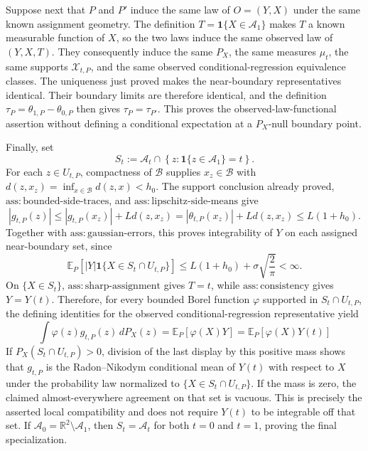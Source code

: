 Suppose next that \(P\) and \(P'\) induce the same law of \(O=(Y,X)\) under the same known assignment geometry. The definition \(T=\mathbf 1\{X\in\mathcal A_1\}\) makes \(T\) a known measurable function of \(X\), so the two laws induce the same observed law of \((Y,X,T)\). They consequently induce the same \(P_X\), the same measures \(\mu_t\), the same supports \(\mathcal X_{t,P}\), and the same observed conditional-regression equivalence classes. The uniqueness just proved makes the near-boundary representatives identical. Their boundary limits are therefore identical, and the definition \(\tau_P=\theta_{1,P}-\theta_{0,P}\) then gives \(\tau_P=\tau_{P'}\). This proves the observed-law-functional assertion without defining a conditional expectation at a \(P_X\)-null boundary point.

Finally, set
\[
S_t:=\mathcal A_t\cap\left\{z:\mathbf 1\{z\in\mathcal A_1\}=t\right\}.
\]
For each \(z\in U_{t,P}\), compactness of \(\mathcal B\) supplies \(x_z\in\mathcal B\) with \(d(z,x_z)=\inf_{x\in\mathcal B}d(z,x)<h_0\). The support conclusion already proved, \(\mathrm{ass:bounded\text{-}side\text{-}traces}\), and \(\mathrm{ass:lipschitz\text{-}side\text{-}means}\) give
\[
|g_{t,P}(z)|\le |g_{t,P}(x_z)|+Ld(z,x_z)
=|\theta_{t,P}(x_z)|+Ld(z,x_z)
\le L(1+h_0).
\]
Together with \(\mathrm{ass:gaussian\text{-}errors}\), this proves integrability of \(Y\) on each assigned near-boundary set, since
\[
\mathbb E_P\!\left[|Y|\mathbf 1\{X\in S_t\cap U_{t,P}\}\right]
\le L(1+h_0)+\sigma\sqrt{\frac{2}{\pi}}<\infty.
\]
On \(\{X\in S_t\}\), \(\mathrm{ass:sharp\text{-}assignment}\) gives \(T=t\), while \(\mathrm{ass:consistency}\) gives \(Y=Y(t)\). Therefore, for every bounded Borel function \(\varphi\) supported in \(S_t\cap U_{t,P}\), the defining identities for the observed conditional-regression representative yield
\[
\int \varphi(z)g_{t,P}(z)\,dP_X(z)
=\mathbb E_P\!\left[\varphi(X)Y\right]
=\mathbb E_P\!\left[\varphi(X)Y(t)\right]
\]
If \(P_X(S_t\cap U_{t,P})>0\), division of the last display by this positive mass shows that \(g_{t,P}\) is the Radon--Nikodym conditional mean of \(Y(t)\) with respect to \(X\) under the probability law normalized to \(\{X\in S_t\cap U_{t,P}\}\). If the mass is zero, the claimed almost-everywhere agreement on that set is vacuous. This is precisely the asserted local compatibility and does not require \(Y(t)\) to be integrable off that set. If \(\mathcal A_0=\mathbb R^2\setminus\mathcal A_1\), then \(S_t=\mathcal A_t\) for both \(t=0\) and \(t=1\), proving the final specialization.